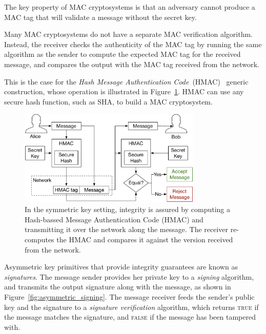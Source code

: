 The key property of MAC cryptosystems is that an adversary cannot produce a
MAC tag that will validate a message without the secret key.

Many MAC cryptosystems do not have a separate MAC verification algorithm.
Instead, the receiver checks the authenticity of the MAC tag by running the
same algorithm as the sender to compute the expected MAC tag for the received
message, and compares the output with the MAC tag received from the network.

This is the case for the
\textit{Hash Message Authentication Code}~(HMAC)~\cite{krawczyk1997hmac}
generic construction, whose operation is illustrated in
Figure~\ref{fig:symmetric_hmac}. HMAC can use any secure hash function, such as
SHA, to build a MAC cryptosystem.

\begin{figure}[hbt]
  \centering
  \includegraphics[width=87mm]{figures/symmetric_hmac.pdf}
  \caption{
    In the symmetric key setting, integrity is assured by computing a
    Hash-bassed Message Authentication Code (HMAC) and transmitting it over the
    network along the message. The receiver re-computes the HMAC and compares
    it against the version received from the network.
  }
  \label{fig:symmetric_hmac}
\end{figure}

Asymmetric key primitives that provide integrity guarantees are known as
\textit{signatures}. The message sender provides her private key to a
\textit{signing} algorithm, and transmits the output signature along with the
message, as shown in Figure~\ref{fig:asymmetric_signing}. The message receiver
feeds the sender's public key and the signature to a \textit{signature
verification} algorithm, which returns \textsc{true} if the message matches the
signature, and \textsc{false} if the message has been tampered with.

